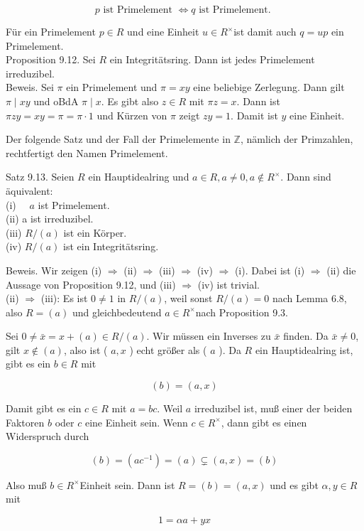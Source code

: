 \documentclass[10pt, letterpaper]{article}
\begin{document}
$$
p \text { ist Primelement } \Longleftrightarrow q \text { ist Primelement. }
$$

Für ein Primelement $p \in R$ und eine Einheit $u \in R^{\times}$ist damit auch $q=u p$ ein Primelement.\\
Proposition 9.12. Sei $R$ ein Integritätsring. Dann ist jedes Primelement irreduzibel.\\
Beweis. Sei $\pi$ ein Primelement und $\pi=x y$ eine beliebige Zerlegung. Dann gilt $\pi \mid x y$ und oBdA $\pi \mid x$. Es gibt also $z \in R$ mit $\pi z=x$. Dann ist $\pi z y=x y=\pi=\pi \cdot 1$ und Kürzen von $\pi$ zeigt $z y=1$. Damit ist $y$ eine Einheit.

Der folgende Satz und der Fall der Primelemente in $\mathbb{Z}$, nämlich der Primzahlen, rechtfertigt den Namen Primelement.

Satz 9.13. Seien $R$ ein Hauptidealring und $a \in R, a \neq 0, a \notin R^{\times}$. Dann sind äquivalent:\\
(i) $\quad a$ ist Primelement.\\
(ii) a ist irreduzibel.\\
(iii) $R /(a)$ ist ein Körper.\\
(iv) $R /(a)$ ist ein Integritätsring.

Beweis. Wir zeigen (i) $\Longrightarrow$ (ii) $\Longrightarrow$ (iii) $\Longrightarrow$ (iv) $\Longrightarrow$ (i). Dabei ist (i) $\Longrightarrow$ (ii) die Aussage von Proposition 9.12, und (iii) $\Longrightarrow$ (iv) ist trivial.\\
(ii) $\Longrightarrow$ (iii): Es ist $0 \neq 1$ in $R /(a)$, weil sonst $R /(a)=0$ nach Lemma 6.8, also $R=(a)$ und gleichbedeutend $a \in R^{\times}$nach Proposition 9.3.

Sei $0 \neq \bar{x}=x+(a) \in R /(a)$. Wir müssen ein Inverses zu $\bar{x}$ finden. Da $\bar{x} \neq 0$, gilt $x \notin(a)$, also ist ( $a, x$ ) echt größer als ( $a$ ). Da $R$ ein Hauptidealring ist, gibt es ein $b \in R$ mit

$$
(b)=(a, x)
$$

Damit gibt es ein $c \in R$ mit $a=b c$. Weil $a$ irreduzibel ist, muß einer der beiden Faktoren $b$ oder $c$ eine Einheit sein. Wenn $c \in R^{\times}$, dann gibt es einen Widerspruch durch

$$
(b)=\left(a c^{-1}\right)=(a) \subsetneq(a, x)=(b)
$$

Also muß $b \in R^{\times}$Einheit sein. Dann ist $R=(b)=(a, x)$ und es gibt $\alpha, y \in R$ mit

$$
1=\alpha a+y x
$$
\end{document}

